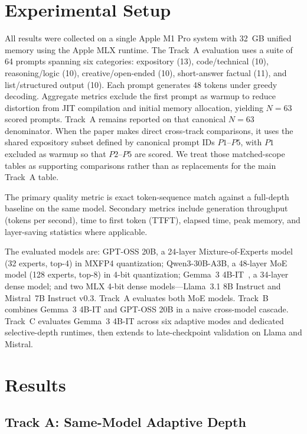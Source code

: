 \documentclass[11pt]{article}
\begin{document}
\section{Experimental Setup}

All results were collected on a single Apple M1 Pro system with 32~GB unified memory using the Apple MLX runtime. The Track~A evaluation uses a suite of 64 prompts spanning six categories: expository (13), code/technical (10), reasoning/logic (10), creative/open-ended (10), short-answer factual (11), and list/structured output (10). Each prompt generates 48 tokens under greedy decoding. Aggregate metrics exclude the first prompt as warmup to reduce distortion from JIT compilation and initial memory allocation, yielding $N{=}63$ scored prompts. Track~A remains reported on that canonical $N{=}63$ denominator. When the paper makes direct cross-track comparisons, it uses the shared expository subset defined by canonical prompt IDs $P1$--$P5$, with $P1$ excluded as warmup so that $P2$--$P5$ are scored. We treat those matched-scope tables as supporting comparisons rather than as replacements for the main Track~A table.

The primary quality metric is exact token-sequence match against a full-depth baseline on the same model. Secondary metrics include generation throughput (tokens per second), time to first token (TTFT), elapsed time, peak memory, and layer-saving statistics where applicable.

The evaluated models are: GPT-OSS 20B, a 24-layer Mixture-of-Experts model (32 experts, top-4) in MXFP4 quantization; Qwen3-30B-A3B, a 48-layer MoE model (128 experts, top-8) in 4-bit quantization; Gemma~3 4B-IT~\cite{gemma2024report}, a 34-layer dense model; and two MLX 4-bit dense models---Llama~3.1 8B Instruct and Mistral~7B Instruct v0.3. Track~A evaluates both MoE models. Track~B combines Gemma~3 4B-IT and GPT-OSS 20B in a naive cross-model cascade. Track~C evaluates Gemma~3 4B-IT across six adaptive modes and dedicated selective-depth runtimes, then extends to late-checkpoint validation on Llama and Mistral.

\section{Results}

\subsection{Track A: Same-Model Adaptive Depth}
\end{document}
